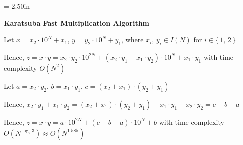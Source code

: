 \documentclass[a4paper,12pt]{article}
\begin{document}
\newpage\thispagestyle{empty}\pdfpageheight = 2.50in\enlargethispage{100in}

\textbf{\large Karatsuba Fast Multiplication Algorithm}

\bigskip

Let $x = x_2 \cdot 10^N + x_1$, $y = y_2 \cdot 10^N + y_1$, where $x_i,\,y_i \in I(N)$ for $i \in \{\,1,\,2\,\}$

\bigskip

Hence, $z = x \cdot y = x_2 \cdot y_2 \cdot 10^{2N} + (x_2 \cdot y_1 + x_1 \cdot y_2) \cdot 10^N + x_1 \cdot y_1$ with time complexity $O(N^2)$

\bigskip

Let $a = x_2 \cdot y_2$, $b = x_1 \cdot y_1$, $c = (x_2 + x_1) \cdot (y_2 + y_1)$

\bigskip

Hence, $x_2 \cdot y_1 + x_1 \cdot y_2 = (x_2 + x_1) \cdot (y_2 + y_1) - x_1 \cdot y_1 - x_2 \cdot y_2 = c - b - a$

\bigskip

Hence, $z = x \cdot y = a \cdot 10^{2N} + (c - b - a) \cdot 10^N + b$ with time complexity $O(N^{\log_{2}3})\approx O(N^{1.585})$
\end{document}
